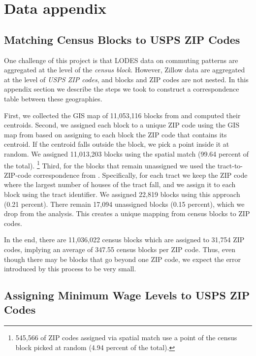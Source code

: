 \clearpage
\section{Data appendix}

\subsection{Matching Census Blocks to USPS ZIP Codes}
\label{sec:blocks_to_uspszip}

One challenge of this project is that LODES data on commuting patterns are 
aggregated at the level of the \textit{census block}.
However, Zillow data are aggregated at the level of \textit{USPS ZIP codes},
and blocks and ZIP codes are not nested.
In this appendix section we describe the steps we took to construct a 
correspondence table between these geographies.

First, we collected the GIS map of 11,053,116 blocks from \textcite{cbTiger} and
computed their centroids.
Second, we assigned each block to a unique ZIP code using the GIS map from 
\textcite{ESRI} based on assigning to each block the ZIP code that contains its 
centroid.
If the centroid falls outside the block, we pick a point inside it at random.
We assigned 11,013,203 blocks using the spatial match (99.64 percent of the 
total).%
\footnote{545,566 of ZIP codes assigned via spatial match use 
a point of the census block picked at random (4.94 percent of the total).}
Third, for the blocks that remain unassigned we used the tract-to-ZIP-code 
correspondence from \textcite{hudCrosswalks}.
Specifically, for each tract we keep the ZIP code where the largest number 
of houses of the tract fall, and we assign it to each block using the tract 
identifier.
We assigned 22,819 blocks using this approach (0.21 percent).
There remain 17,094 unassigned blocks (0.15 percent), which we drop from the 
analysis.
This creates a unique mapping from census blocks to ZIP codes.

In the end, there are 11,036,022 census blocks which are assigned to 31,754 
ZIP codes, implying an average of 347.55 census blocks per ZIP code.
Thus, even though there may be blocks that go beyond one ZIP code, 
we expect the error introduced by this process to be very small.

\subsection{Assigning Minimum Wage Levels to USPS ZIP Codes}
\label{sec:assigning_mw_levels}

